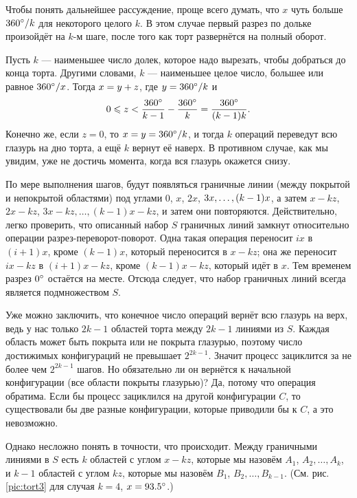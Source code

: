 Чтобы понять дальнейшее рассуждение, проще всего думать, что $x$ чуть больше $360\degree/k$ для некоторого целого $k$.
В этом случае первый разрез по дольке произойдёт на $k$-м шаге, после того как торт развернётся на полный оборот.

Пусть $k$ --- наименьшее число долек, которое надо вырезать, чтобы добраться до конца торта.
Другими словами, $k$ --- наименьшее целое число, большее или равное $360\degree/x$.
Тогда $x \z= y + z$, где $y = 360\degree/k$ и 
\[0\leqslant z <\frac{360\degree}{k-1}-\frac{360\degree}{k}=\frac{360\degree}{(k-1)k}.\]
Конечно же, если $z = 0$, то $x = y = 360\degree/k$, и тогда $k$ операций переведут всю глазурь на дно торта, а ещё $k$ вернут её наверх.
В противном случае, как мы увидим, уже не достичь момента, когда вся глазурь окажется снизу.

По мере выполнения шагов, будут появляться граничные линии (между покрытой и непокрытой областями) под углами $0$, $x$, $2x$, $3x, \z\dots , (k - 1)x$, а затем $x - kz$, $2x - kz$, $3x - kz, \dots , (k - 1)x - kz$,
и затем они повторяются.
Действительно, легко проверить, что описанный набор $S$ граничных линий замкнут относительно операции разрез-переворот-поворот.
Одна такая операция переносит $ix$ в $(i + 1)x$, кроме $(k - 1)x$, который переносится в $x - kz$;
она же переносит $ix - kz$ в $(i + 1)x - kz$, кроме $(k - 1)x - kz$, который идёт в $x$.
Тем временем разрез $0\degree$ остаётся на месте.
Отсюда следует, что набор граничных линий всегда является подмножеством $S$.

Уже можно заключить, что конечное число операций вернёт всю глазурь на верх, ведь у нас только $2k - 1$ областей торта между $2k - 1$ линиями из $S$.
Каждая область может быть покрыта или не покрыта глазурью, поэтому число достижимых конфигураций не превышает $2^{2k-1}$.
Значит процесс зациклится за не более чем $2^{2k-1}$ шагов.
Но обязательно ли он вернётся к начальной конфигурации (все области покрыты глазурью)?
Да, потому что операция обратима.
Если бы процесс зациклился на другой конфигурации $C$, то существовали бы две разные конфигурации, которые приводили бы к $C$, а это невозможно.

Однако несложно понять в точности, что происходит.
Между граничными линиями в $S$ есть $k$ областей с углом $x - kz$, которые мы назовём $A_1$, $A_2, \dots , A_k$, и $k - 1$ областей с углом $kz$, которые мы назовём $B_1$, $B_2, \dots , B_{k-1}$.
(См. рис. \ref{pic:tort3} для случая $k = 4$, $x = 93.5\degree$.)

